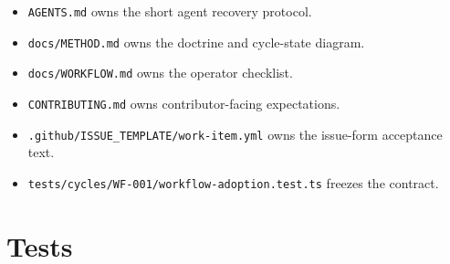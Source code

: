 \begin{itemize}
\tightlist
\item
  \texttt{A\allowbreak{}G\allowbreak{}E\allowbreak{}N\allowbreak{}T\allowbreak{}S\allowbreak{}.\allowbreak{}m\allowbreak{}d} owns the short agent recovery protocol.
\item
  \texttt{d\allowbreak{}o\allowbreak{}c\allowbreak{}s\allowbreak{}/\allowbreak{}M\allowbreak{}E\allowbreak{}T\allowbreak{}H\allowbreak{}O\allowbreak{}D\allowbreak{}.\allowbreak{}m\allowbreak{}d} owns the doctrine and cycle-state diagram.
\item
  \texttt{d\allowbreak{}o\allowbreak{}c\allowbreak{}s\allowbreak{}/\allowbreak{}W\allowbreak{}O\allowbreak{}R\allowbreak{}K\allowbreak{}F\allowbreak{}L\allowbreak{}O\allowbreak{}W\allowbreak{}.\allowbreak{}m\allowbreak{}d} owns the operator checklist.
\item
  \texttt{C\allowbreak{}O\allowbreak{}N\allowbreak{}T\allowbreak{}R\allowbreak{}I\allowbreak{}B\allowbreak{}U\allowbreak{}T\allowbreak{}I\allowbreak{}N\allowbreak{}G\allowbreak{}.\allowbreak{}m\allowbreak{}d} owns contributor-facing expectations.
\item
  \texttt{.\allowbreak{}g\allowbreak{}i\allowbreak{}t\allowbreak{}h\allowbreak{}u\allowbreak{}b\allowbreak{}/\allowbreak{}I\allowbreak{}S\allowbreak{}S\allowbreak{}U\allowbreak{}E\allowbreak{}\_\allowbreak{}T\allowbreak{}E\allowbreak{}M\allowbreak{}P\allowbreak{}L\allowbreak{}A\allowbreak{}T\allowbreak{}E\allowbreak{}/\allowbreak{}w\allowbreak{}o\allowbreak{}r\allowbreak{}k\allowbreak{}-\allowbreak{}i\allowbreak{}t\allowbreak{}e\allowbreak{}m\allowbreak{}.\allowbreak{}y\allowbreak{}m\allowbreak{}l} owns the issue-form acceptance text.
\item
  \texttt{t\allowbreak{}e\allowbreak{}s\allowbreak{}t\allowbreak{}s\allowbreak{}/\allowbreak{}c\allowbreak{}y\allowbreak{}c\allowbreak{}l\allowbreak{}e\allowbreak{}s\allowbreak{}/\allowbreak{}W\allowbreak{}F\allowbreak{}-\allowbreak{}0\allowbreak{}0\allowbreak{}1\allowbreak{}/\allowbreak{}w\allowbreak{}o\allowbreak{}r\allowbreak{}k\allowbreak{}f\allowbreak{}l\allowbreak{}o\allowbreak{}w\allowbreak{}-\allowbreak{}a\allowbreak{}d\allowbreak{}o\allowbreak{}p\allowbreak{}t\allowbreak{}i\allowbreak{}o\allowbreak{}n\allowbreak{}.\allowbreak{}t\allowbreak{}e\allowbreak{}s\allowbreak{}t\allowbreak{}.\allowbreak{}t\allowbreak{}s} freezes the contract.
\end{itemize}

\section{Tests}\label{record-208-tests}

